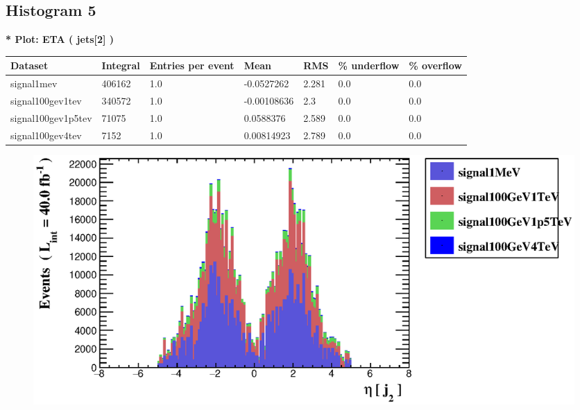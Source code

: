 \documentclass[a4paper, 10pt]{article}
\begin{document}
\subsection{ Histogram 5}

\textbf{* Plot: ETA ( jets[2] ) }\\
   \begin{table}[H]
  \begin{center}
    \begin{tabular}{|m{23.0mm}|m{23.0mm}|m{18.0mm}|m{19.0mm}|m{19.0mm}|m{19.0mm}|m{19.0mm}|}
      \hline
      {\cellcolor{yellow}         Dataset}& {\cellcolor{yellow}         Integral}& {\cellcolor{yellow}         Entries per event}& {\cellcolor{yellow}         Mean}& {\cellcolor{yellow}         RMS}& {\cellcolor{yellow}         \% underflow}& {\cellcolor{yellow}         \% overflow}\\
      \hline
      {\cellcolor{white}         signal1mev}& {\cellcolor{white}         406162}& {\cellcolor{white}         1.0}& {\cellcolor{white}         -0.0527262}& {\cellcolor{white}         2.281}& {\cellcolor{green}         0.0}& {\cellcolor{green}         0.0}\\
      \hline
      {\cellcolor{white}         signal100gev1tev}& {\cellcolor{white}         340572}& {\cellcolor{white}         1.0}& {\cellcolor{white}         -0.00108636}& {\cellcolor{white}         2.3}& {\cellcolor{green}         0.0}& {\cellcolor{green}         0.0}\\
      \hline
      {\cellcolor{white}         signal100gev1p5tev}& {\cellcolor{white}         71075}& {\cellcolor{white}         1.0}& {\cellcolor{white}         0.0588376}& {\cellcolor{white}         2.589}& {\cellcolor{green}         0.0}& {\cellcolor{green}         0.0}\\
      \hline
      {\cellcolor{white}         signal100gev4tev}& {\cellcolor{white}         7152}& {\cellcolor{white}         1.0}& {\cellcolor{white}         0.00814923}& {\cellcolor{white}         2.789}& {\cellcolor{green}         0.0}& {\cellcolor{green}         0.0}\\
\hline
    \end{tabular}
  \end{center}
\end{table}

\begin{figure}[H]
  \begin{center}
    \includegraphics[scale=0.45]{selection_4.eps}\\
\caption{   }
  \end{center}
\end{figure}
      \newpage
\end{document}
